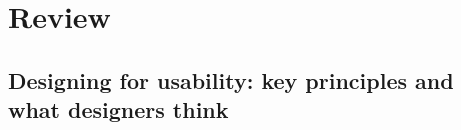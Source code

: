 \documentclass[12pt]{article}
\begin{document}

\clearpage\maketitle
\thispagestyle{empty}

\newpage

\tableofcontents

\thispagestyle{empty}

\newpage
\pagestyle{plain}
\setcounter{page}{1}

\section{Review}
\subsection{Designing for usability: key principles and what designers think}
\label{sub:designing_for_usability}
\end{document}
